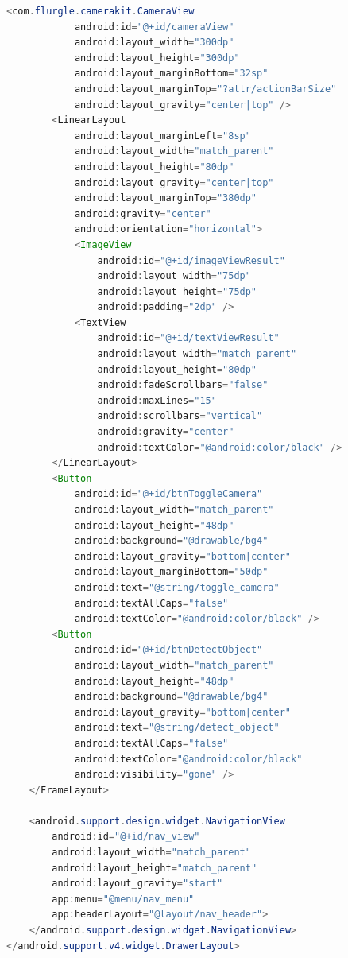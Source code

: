 \documentclass[UTF8, Microsoft YaHei]{book}
\begin{document}
\begin{small}
\begin{lstlisting}[language=java]
        <com.flurgle.camerakit.CameraView
            android:id="@+id/cameraView"
            android:layout_width="300dp"
            android:layout_height="300dp"
            android:layout_marginBottom="32sp"
            android:layout_marginTop="?attr/actionBarSize"
            android:layout_gravity="center|top" />
        <LinearLayout
            android:layout_marginLeft="8sp"
            android:layout_width="match_parent"
            android:layout_height="80dp"
            android:layout_gravity="center|top"
            android:layout_marginTop="380dp"
            android:gravity="center"
            android:orientation="horizontal">
            <ImageView
                android:id="@+id/imageViewResult"
                android:layout_width="75dp"
                android:layout_height="75dp"
                android:padding="2dp" />
            <TextView
                android:id="@+id/textViewResult"
                android:layout_width="match_parent"
                android:layout_height="80dp"
                android:fadeScrollbars="false"
                android:maxLines="15"
                android:scrollbars="vertical"
                android:gravity="center"
                android:textColor="@android:color/black" />
        </LinearLayout>
        <Button
            android:id="@+id/btnToggleCamera"
            android:layout_width="match_parent"
            android:layout_height="48dp"
            android:background="@drawable/bg4"
            android:layout_gravity="bottom|center"
            android:layout_marginBottom="50dp"
            android:text="@string/toggle_camera"
            android:textAllCaps="false"
            android:textColor="@android:color/black" />
        <Button
            android:id="@+id/btnDetectObject"
            android:layout_width="match_parent"
            android:layout_height="48dp"
            android:background="@drawable/bg4"
            android:layout_gravity="bottom|center"
            android:text="@string/detect_object"
            android:textAllCaps="false"
            android:textColor="@android:color/black"
            android:visibility="gone" />
    </FrameLayout>

    <android.support.design.widget.NavigationView
        android:id="@+id/nav_view"
        android:layout_width="match_parent"
        android:layout_height="match_parent"
        android:layout_gravity="start"
        app:menu="@menu/nav_menu"
        app:headerLayout="@layout/nav_header">
    </android.support.design.widget.NavigationView>
</android.support.v4.widget.DrawerLayout>
\end{lstlisting}
\end{small}
\end{document}

